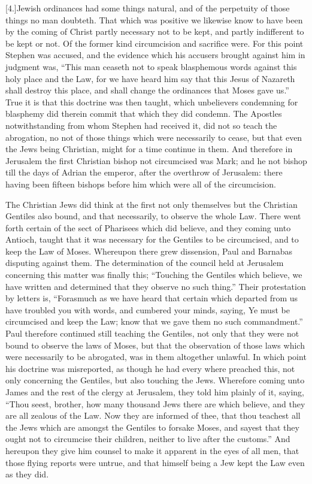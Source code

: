 [4.]Jewish ordinances had some things natural, and of the perpetuity of those things no man doubteth. That which was positive we likewise know to have been by the coming of Christ partly necessary not to be kept, and partly indifferent to be kept or not. Of the former kind circumcision and  sacrifice were. For this point Stephen was accused, and the evidence which his accusers brought against him in judgment was, “This man ceaseth not to speak blasphemous words against this holy place and the Law, for we have heard him say that this Jesus of Nazareth shall destroy this place, and shall change the ordinances that Moses gave us.” True it is that this doctrine was then taught, which unbelievers condemning for blasphemy did therein commit that which they did condemn. The Apostles notwithstanding from whom Stephen had received it, did not so teach the abrogation, no not of those things which were necessarily to cease, but that even the Jews being Christian, might for a time continue in them. And therefore in Jerusalem the first Christian bishop not circumcised was Mark; and he not bishop till the days of Adrian the emperor, after the overthrow of Jerusalem: there having been fifteen bishops before him which were all of the circumcision.

The Christian Jews did think at the first not only themselves but the Christian Gentiles also bound, and that necessarily, to observe the whole Law. There went forth certain of the sect of Pharisees which did believe, and they coming unto Antioch, taught that it was necessary for the Gentiles to be circumcised, and to keep the Law of Moses. Whereupon there grew dissension, Paul and Barnabas disputing against them. The determination of the council held at Jerusalem concerning this matter was finally this; “Touching the Gentiles which believe, we have written and determined that they observe no such thing.” Their protestation by letters is, “Forasmuch as we have heard that certain which departed from us have troubled you with words, and cumbered your minds, saying, Ye must be circumcised and keep the Law; know that we gave them no such commandment.” Paul therefore continued still teaching the Gentiles, not only that they were not bound to observe the laws of Moses, but  that the observation of those laws which were necessarily to be abrogated, was in them altogether unlawful. In which point his doctrine was misreported, as though he had every where preached this, not only concerning the Gentiles, but also touching the Jews. Wherefore coming unto James and the rest of the clergy at Jerusalem, they told him plainly of it, saying, “Thou seest, brother, how many thousand Jews there are which believe, and they are all zealous of the Law. Now they are informed of thee, that thou teachest all the Jews which are amongst the Gentiles to forsake Moses, and sayest that they ought not to circumcise their children, neither to live after the customs.” And hereupon they give him counsel to make it apparent in the eyes of all men, that those flying reports were untrue, and that himself being a Jew kept the Law even as they did.

